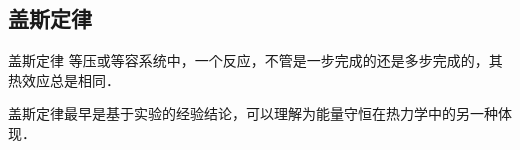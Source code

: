 
\subsection{盖斯定律}
\begin{theorem}{盖斯定律}
等压或等容系统中，一个反应，不管是一步完成的还是多步完成的，其热效应总是相同．
\end{theorem}
盖斯定律最早是基于实验的经验结论，可以理解为能量守恒在热力学中的另一种体现．